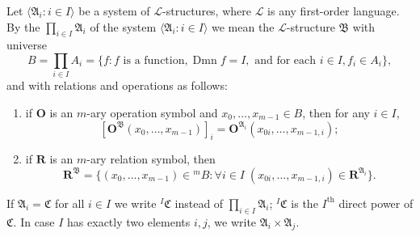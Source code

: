 Let $\langle \mathfrak{A}_i : i \in I \rangle$ be a system of $\mathcal{L}$-structures, where $\mathcal{L}$ is any first-order language. By the  $\prod_{i \in I} \mathfrak{A}_i$ of the system $\langle \mathfrak{A}_i : i \in I \rangle$ we mean the $\mathcal{L}$-structure $\mathfrak{B}$ with universe
$$B = \prod_{i \in I} A_i = \{f : f \text{ is a function}, \operatorname{Dmn} f = I, \text{ and for each } i \in I, f_i \in A_i\},$$
and with relations and operations as follows:

\begin{enumerate}
\item[(i)] if $\mathbf{O}$ is an $m$-ary operation symbol and $x_0, \ldots, x_{m-1} \in B$, then for any $i \in I$,
$$[\mathbf{O}^{\mathfrak{B}}(x_0, \ldots, x_{m-1})]_i = \mathbf{O}^{\mathfrak{A}_i}(x_{0i}, \ldots, x_{m-1,i});$$

\item[(ii)] if $\mathbf{R}$ is an $m$-ary relation symbol, then
$$\mathbf{R}^{\mathfrak{B}} = \{(x_0, \ldots, x_{m-1}) \in {}^m B : \forall i \in I \; (x_{0i}, \ldots, x_{m-1,i}) \in \mathbf{R}^{\mathfrak{A}_i}\}.$$
\end{enumerate}

If $\mathfrak{A}_i = \mathfrak{C}$ for all $i \in I$ we write ${}^I\mathfrak{C}$ instead of $\prod_{i \in I} \mathfrak{A}_i$; ${}^I\mathfrak{C}$ is the $I^{\text{th}}$ direct power of $\mathfrak{C}$. In case $I$ has exactly two elements $i, j$, we write $\mathfrak{A}_i \times \mathfrak{A}_j$.
